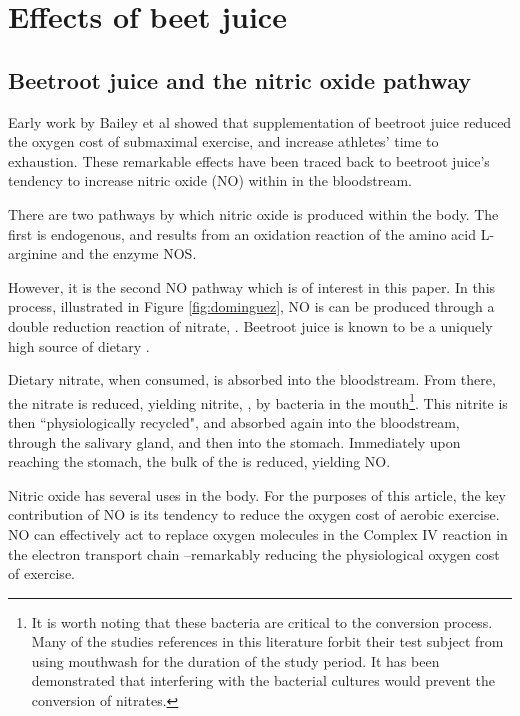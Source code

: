 \chapter{Effects of beet juice}
\section{Beetroot juice and the nitric oxide pathway}
Early work by Bailey et al showed that supplementation of beetroot juice reduced the oxygen cost of submaximal exercise, and increase athletes' time to exhaustion\cite[1]{bailey2009dietary}. These remarkable effects have been traced back to beetroot juice's tendency to increase nitric oxide ($\mathrm{NO}$) within in the bloodstream.

There are two pathways by which nitric oxide is produced within the body. The first is endogenous, and results from an oxidation reaction of the amino acid L-arginine and the enzyme NOS\cite[1]{boorsma2013effect}\cite[1]{lundberg2008nitrate}.

However, it is the second $\mathrm{NO}$ pathway which is of interest in this paper. 
In this process, illustrated in Figure \ref{fig:dominguez}, $\mathrm{NO}$ is can be produced through a double reduction reaction of nitrate, \notm. Beetroot juice is known to be a uniquely high source of dietary \notm\cite{bailey2009dietary}. 

Dietary nitrate, when consumed, is absorbed into the bloodstream. From there, the nitrate is reduced, yielding nitrite, \nottm, by bacteria in the mouth\footnote{It is worth noting that these bacteria are critical to the conversion process. Many of the studies references in this literature forbit their test subject from using mouthwash for the duration of the study period. It has been demonstrated that interfering with the bacterial cultures would prevent the conversion of nitrates\cite{govoni2008increase}.}. This nitrite is then ``physiologically recycled"\cite[1]{lundberg2008nitrate}, and absorbed again into the bloodstream, through the salivary gland, and then into the stomach. Immediately upon reaching the stomach, the bulk of the \nottm is reduced, yielding $\mathrm{NO}$.

Nitric oxide has several uses in the body. For the purposes of this article, the key contribution of $\mathrm{NO}$ is its tendency to reduce the oxygen cost of aerobic exercise. $\mathrm{NO}$ can effectively act to replace oxygen molecules in the Complex IV reaction in the electron transport chain \cite[19]{boorsma2013effect}--remarkably reducing the physiological oxygen cost of exercise.

